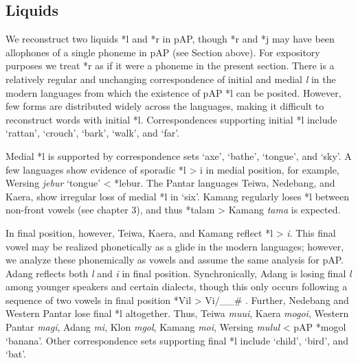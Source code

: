 \subsection{ Liquids}
We reconstruct two liquids *l and *r in pAP, though *r and *j may have been allophones of a single phoneme in pAP (see Section above). For expository purposes we treat *r as if it were a phoneme in the present section. There is a relatively regular and unchanging correspondence of initial and medial \textit{l} in the modern languages from which the existence of pAP *l can be posited. However, few forms are distributed widely across the languages, making it difficult to reconstruct words with initial *l. Correspondences supporting initial *l include `rattan', `crouch', `bark', `walk', and `far'. 

Medial *l is supported by correspondence sets `axe', `bathe', `tongue', and `sky'. A few languages show evidence of sporadic *l {\textgreater} i in medial position, for example, Wersing \textit{jebur }`tongue' {\textless} *lebur. The Pantar languages Teiwa, Nedebang, and Kaera, show irregular loss of medial *l in `six'. Kamang regularly loses *l between non-front vowels (see chapter 3), and thus *talam {\textgreater} Kamang \textit{ta{\textlengthmark}ma} is expected. 

In final position, however, Teiwa, Kaera, and Kamang reflect *l {\textgreater} \textit{i}. This final vowel may be realized phonetically as a glide in the modern languages; however, we analyze these phonemically as vowels and assume the same analysis for pAP. Adang reflects both \textit{l }and \textit{i} in final position. Synchronically, Adang is losing final \textit{l} among younger speakers and certain dialects, though this only occurs following a sequence of two vowels in final position *Vil {\textgreater} Vi/\_\_\# \citep{RobinsonEtAlforthcoming}. Further, Nedebang and Western Pantar lose final *l altogether. Thus, Teiwa \textit{mu{\pharfric}ui}, Kaera \textit{mogoi}, Western Pantar \textit{mag{\textlengthmark}i}, Adang \textit{m{\textopeno}}\textit{{\textglotstop}}\textit{{\textopeno}i}, Klon \textit{m{\textschwa}gol}, Kamang \textit{mo{\textlengthmark}i}, Wersing \textit{mulul }{\textless} pAP *mogol `banana'. Other correspondence sets supporting final *l include `child', `bird', and `bat'. 

